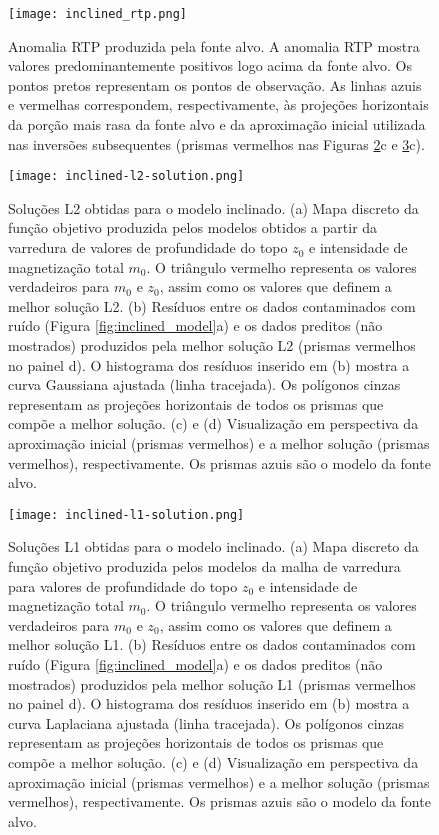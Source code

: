\begin{figure}[!htb]
	\centering
	\texttt{[image: inclined\_rtp.png]}
	\caption{Anomalia RTP produzida pela fonte alvo. 
		A anomalia RTP mostra valores predominantemente positivos logo acima da fonte alvo. Os pontos pretos representam os pontos de observação. As linhas azuis e vermelhas correspondem, respectivamente, às projeções horizontais da porção mais rasa da fonte alvo e da aproximação inicial utilizada nas inversões subsequentes (prismas vermelhos nas Figuras \ref{fig:inclined_l2_result}c e 
		\ref{fig:inclined_l1_result}c).
	}
	\label{fig:inclined_model_rtp}
\end{figure}

\pagebreak

\begin{figure}[!htb]
	\centering
	\texttt{[image: inclined-l2-solution.png]}
	\caption{Soluções L2 obtidas para o modelo inclinado. 
		(a) Mapa discreto da função objetivo produzida pelos modelos obtidos a partir da varredura de valores de profundidade do topo $z_{0}$ e intensidade de magnetização total $m_{0}$. 
		O triângulo vermelho representa os valores verdadeiros para $m_{0}$ e $z_{0}$, assim como os valores que definem a melhor solução L2.
		(b) Resíduos entre os dados contaminados com ruído (Figura \ref{fig:inclined_model}a) 
		e os dados preditos (não mostrados) produzidos pela melhor solução L2 (prismas vermelhos no painel d). 
		O histograma dos resíduos inserido em (b) mostra a curva Gaussiana ajustada (linha tracejada).
		Os polígonos cinzas representam as projeções horizontais de todos os prismas que compõe a melhor solução. 
		(c) e (d) Visualização em perspectiva da aproximação inicial (prismas vermelhos) e 
		a melhor solução (prismas vermelhos), respectivamente. Os prismas azuis são o modelo da fonte alvo. 
	}
	\label{fig:inclined_l2_result}
\end{figure}
\pagebreak
\begin{figure}[!htb]
	\centering
	\texttt{[image: inclined-l1-solution.png]}
	\caption{Soluções L1 obtidas para o modelo inclinado. 
		(a) Mapa discreto da função objetivo produzida pelos modelos da malha de varredura para valores de profundidade do topo $z_{0}$ e intensidade de magnetização total $m_{0}$. 
		O triângulo vermelho representa os valores verdadeiros para $m_{0}$ e $z_{0}$, assim como os valores que definem a melhor solução L1.
		(b) Resíduos entre os dados contaminados com ruído (Figura \ref{fig:inclined_model}a) 
		e os dados preditos (não mostrados) produzidos pela melhor solução L1 (prismas vermelhos no painel d). 
		O histograma dos resíduos inserido em (b) mostra a curva Laplaciana ajustada (linha tracejada).
		Os polígonos cinzas representam as projeções horizontais de todos os prismas que compõe a melhor solução. 
		(c) e (d) Visualização em perspectiva da aproximação inicial (prismas vermelhos) e 
		a melhor solução (prismas vermelhos), respectivamente. Os prismas azuis são o modelo da fonte alvo. 
	}
	\label{fig:inclined_l1_result}
\end{figure}
\pagebreak

